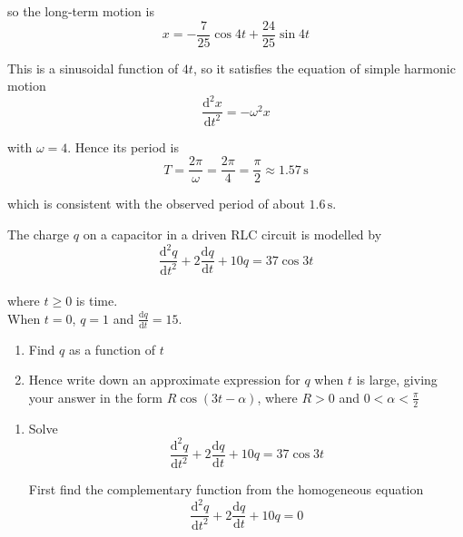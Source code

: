 \documentclass[leqno]{article}
\begin{document}
\begin{enumerate}[
  label=\textbf{\arabic*.},
  leftmargin=*,
  topsep=0pt,
  partopsep=0pt,
  parsep=0pt
]
\begin{djsSolution}
\begin{enumerate}[label=\textbf{(\alph*)}]
\begin{enumerate}[label=(\roman*)]
    so the long-term motion is
    \[
    x=-\frac{7}{25}\cos 4t+\frac{24}{25}\sin 4t
    \]

    This is a sinusoidal function of \(4t\), so it satisfies the equation of simple harmonic motion
    \[
    \frac{\mathrm{d}^2x}{\mathrm{d}t^2}=-\omega^2x
    \]

    with \(\omega=4\). Hence its period is
    \[
    T=\frac{2\pi}{\omega}=\frac{2\pi}{4}=\frac{\pi}{2}\approx 1.57\,\mathrm{s}
    \]

    which is consistent with the observed period of about \(1.6\,\mathrm{s}\).
  \end{enumerate}
\end{enumerate}
\end{djsSolution}


\newpage

\questionitem

The charge $q$ on a capacitor in a driven RLC circuit is modelled by \\
\[\frac{\mathrm{d}^2 q}{\mathrm{d} t^2}+2\frac{\mathrm{d} q}{\mathrm{d} t}+10q=37\cos 3t\] \\
where $t\geq0$ is time. \\

When $t=0$, $q=1$ and $\frac{\mathrm{d} q}{\mathrm{d} t}=15$. \\

\begin{enumerate}[label=\textbf{(\alph*)}]
  \item Find $q$ as a function of $t$  \\
  \item Hence write down an approximate expression for $q$ when $t$ is large, giving your answer in the form $R\cos(3t-\alpha)$, where $R>0$ and $0<\alpha<\frac{\pi}{2}$  \\
\end{enumerate}

\vspace*{10pt}

\begin{djsSolution}
\begin{enumerate}[label=\textbf{(\alph*)}]
  \item Solve
  \[
  \frac{\mathrm{d}^2q}{\mathrm{d}t^2}+2\frac{\mathrm{d}q}{\mathrm{d}t}+10q=37\cos 3t
  \]

  First find the complementary function from the homogeneous equation
  \[
  \frac{\mathrm{d}^2q}{\mathrm{d}t^2}+2\frac{\mathrm{d}q}{\mathrm{d}t}+10q=0
  \]


\end{enumerate}
\end{djsSolution}
\end{enumerate}
\end{document}
